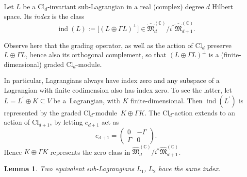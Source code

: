 \documentclass[10pt,a4paper]{amsart}
\numberwithin{equation}{section}
\newtheorem{Lemma}[Theorem]{Lemma}
\newcommand{\C}{\mathbb{C}}
\newcommand{\ind}{\operatorname{ind}}
\newcommand{\Cl}{\mathrm{Cl}}
\begin{document}
\begin{Definition}
Let $L$ be a $\Cl_d$-invariant sub-Lagrangian in a real (complex) degree $d$ Hilbert space.
Its \emph{index} is the class
\begin{equation*}
 \ind(L) := \big[(L \oplus \Gamma L)^\perp\big] \in \hat{\mathfrak{M}}_d^{(\C)} / i^* \hat{\mathfrak{M}}_{d+1}^{(\C)}.
\end{equation*}
\end{Definition}

Observe here that the grading operator, as well as the action of $\Cl_d$ preserve $L \oplus \Gamma L$, hence also its orthogonal complement, so that $(L \oplus \Gamma L)^\perp$ is a (finite-dimensional) graded $\Cl_d$-module.


\begin{Example}
In particular, Lagrangians always have index zero and any subspace of a Lagrangian with finite codimension also has index zero.
To see the latter, let $L = L^\prime \oplus K \subseteq V$ be a~Lagrangian, with $K$ finite-dimensional.
Then $\ind(L^\prime)$ is represented by the graded $\Cl_d$-module~${K \oplus \Gamma K}$.
The $\Cl_d$-action extends to an action of $\Cl_{d+1}$, by letting $e_{d+1}$ act as
\begin{equation*}
 e_{d+1} = \begin{pmatrix} 0 & -\Gamma \\ \Gamma & 0 \end{pmatrix}.
\end{equation*}
Hence $K \oplus \Gamma K$ represents the zero class in $\hat{\mathfrak{M}}_d^{(\C)} / i^* \hat{\mathfrak{M}}_{d+1}^{(\C)}$.
\end{Example}

\begin{Lemma}
Two equivalent sub-Lagrangians $L_1$, $L_2$ have the same index.
\end{Lemma}
\end{document}
